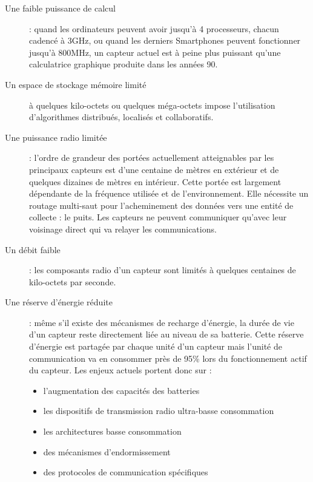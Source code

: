 \begin{description}
\item[Une faible puissance de calcul] : quand les ordinateurs peuvent avoir jusqu'à 4 processeurs, chacun cadencé à 3GHz, ou quand les derniers Smartphones peuvent fonctionner jusqu’à 800MHz, un capteur actuel est à peine plus puissant qu’une calculatrice graphique produite dans les années 90.

\item[Un espace de stockage mémoire limité] à quelques kilo-octets ou quelques méga-octets impose l'utilisation d'algorithmes distribués, localisés et collaboratifs.

\item[Une puissance radio limitée] : l’ordre de grandeur des portées actuellement atteignables par les principaux capteurs est d’une centaine de mètres en extérieur et de quelques dizaines de mètres en intérieur. Cette portée est largement dépendante de la fréquence utilisée et de l’environnement. Elle nécessite un routage multi-saut pour l’acheminement des données vers une entité de collecte : le puits. Les capteurs ne peuvent communiquer qu’avec leur voisinage direct qui va relayer les communications.

\item[Un débit faible] : les composants radio d’un capteur sont limités à quelques centaines de kilo-octets par seconde.

\item[Une réserve d’énergie réduite] : même s’il existe des mécanismes de recharge d’énergie, la durée de vie d’un capteur reste directement liée au niveau de sa batterie. Cette réserve d’énergie est partagée par chaque unité d’un capteur mais l’unité de communication va en consommer près de 95\% lors du fonctionnement actif du capteur. Les enjeux actuels portent donc sur :
	\begin{itemize}
	\item l’augmentation des capacités des batteries
	\item les dispositifs de transmission radio ultra-basse consommation
	\item les architectures basse consommation
	\item des mécanismes d’endormissement
	\item des protocoles de communication spécifiques
	\end{itemize}
\end{description}



